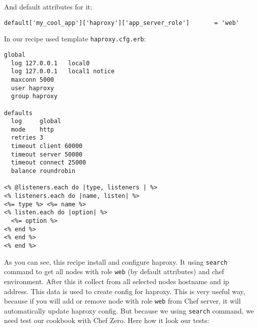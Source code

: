 And default attributes for it:

\begin{lstlisting}[label=lst:testing-chef-zero13]
default['my_cool_app']['haproxy']['app_server_role']       = 'web'
\end{lstlisting}

In our recipe used template \lstinline!haproxy.cfg.erb!:

\begin{lstlisting}[label=lst:testing-chef-zero14]
global
  log 127.0.0.1   local0
  log 127.0.0.1   local1 notice
  maxconn 5000
  user haproxy
  group haproxy

defaults
  log     global
  mode    http
  retries 3
  timeout client 60000
  timeout server 50000
  timeout connect 25000
  balance roundrobin

<% @listeners.each do |type, listeners | %>
<% listeners.each do |name, listen| %>
<%= type %> <%= name %>
<% listen.each do |option| %>
  <%= option %>
<% end %>
<% end %>
<% end %>
\end{lstlisting}

As you can see, this recipe install and configure haproxy. It using \lstinline!search! command to get all nodes with role \lstinline!web! (by default attributes) and chef environment. After this it collect from all selected nodes hostname and ip address. This data is used to create config for haproxy. This is very useful way, because if you will add or remove node with role \lstinline!web! from Chef server, it will automatically update haproxy config. But because we using \lstinline!search! command, we need test our cookbook with Chef Zero. Here how it look our tests:

